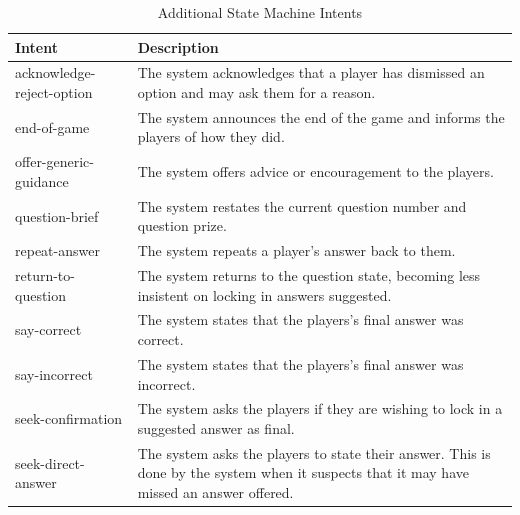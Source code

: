 \documentclass[hidelinks, 11pt]{article}
\begin{document}
\noindent
\begin{table}[h!]
  \begin{tabular}{ | p{2cm} | p{5cm} | }
    \hline
    \rowcolor[HTML]{BFD8EC}
    \textbf{Intent}           & \textbf{Description}                                                                                                                      \\
    \hline
    acknowledge-reject-option & The system acknowledges that a player has dismissed an option and may ask them for a reason.                                              \\
    \hline

    end-of-game               & The system announces the end of the game and informs the players of how they did.                                                         \\
    \hline

    offer-generic-guidance    & The system offers advice or encouragement to the players.                                                                                 \\
    \hline

    question-brief            & The system restates the current question number and question prize.                                                                       \\
    \hline

    repeat-answer             & The system repeats a player's answer back to them.                                                                                        \\
    \hline

    return-to-question        & The system returns to the question state, becoming less insistent on locking in answers suggested.                                        \\
    \hline

    say-correct               & The system states that the players's final answer was correct.                                                                            \\
    \hline

    say-incorrect             & The system states that the players's final answer was incorrect.                                                                          \\
    \hline

    seek-confirmation         & The system asks the players if they are wishing to lock in a suggested answer as final.                                                   \\
    \hline

    seek-direct-answer        & The system asks the players to state their answer. This is done by the system when it suspects that it may have missed an answer offered. \\
    \hline
  \end{tabular}
  \caption{Additional State Machine Intents}
  \label{table:state_machine_intents}
\end{table}
\end{document}
